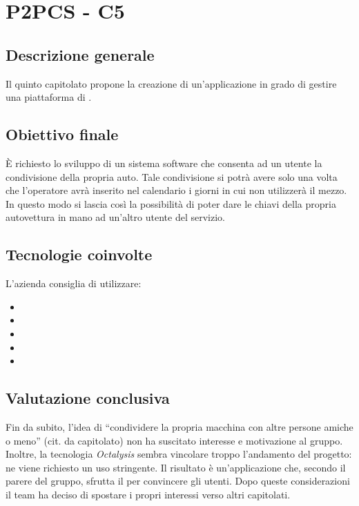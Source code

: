 \section{P2PCS - C5} \label{c5}
    \subsection{Descrizione generale}
    Il quinto capitolato propone la creazione di un'applicazione  in grado di gestire una piattaforma di 
    .

    \subsection{Obiettivo finale}
    \`E richiesto lo sviluppo di un sistema software che consenta ad un utente la condivisione della propria auto. Tale condivisione si potrà
    avere solo una volta che l'operatore avrà inserito nel calendario i giorni in cui non utilizzerà il mezzo.
    In questo modo si lascia così la possibilità di poter dare le chiavi della propria autovettura in mano ad un'altro utente del servizio.

    \subsection{Tecnologie coinvolte}
    L'azienda consiglia di utilizzare:
        \begin{itemize}
        \item {}
        \item {}
        \item {}
        \item {}
        \item {}
    \end{itemize}

    \subsection{Valutazione conclusiva}
    Fin da subito, l'idea di ``condividere la propria macchina con altre persone amiche o meno'' (cit. da capitolato) non ha suscitato interesse
    e motivazione al gruppo. Inoltre, la tecnologia \textit{Octalysis} sembra vincolare troppo l'andamento del progetto: ne viene richiesto un
    uso stringente. Il risultato è un'applicazione che, secondo il parere del gruppo, sfrutta il  per convincere gli utenti.
    Dopo queste considerazioni il team ha deciso di spostare i propri interessi verso altri capitolati.
